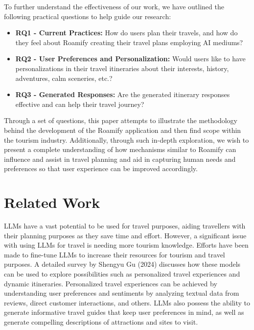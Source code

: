 \documentclass[final,3p,times,authoryear]{elsarticle}
\begin{document}
    To further understand the effectiveness of our work, we have outlined the following practical questions to help guide our research:
    
    \begin{itemize}
        \item \textbf{RQ1 - Current Practices:} How do users plan their travels, and how do they feel about Roamify creating their travel plans employing AI mediums?
        \item \textbf{RQ2 - User Preferences and Personalization:} Would users like to have personalizations in their travel itineraries about their interests, history, adventures, calm sceneries, etc.?
        \item \textbf{RQ3 - Generated Responses:} Are the generated itinerary responses effective and can help their travel journey?
        
    \end{itemize}
    
    Through a set of questions, this paper attempts to illustrate the methodology behind the development of the Roamify application and then find scope within the tourism industry. Additionally, through such in-depth exploration, we wish to present a complete understanding of how mechanisms similar to Roamify can influence and assist in travel planning and aid in capturing human needs and preferences so that user experience can be improved accordingly.

\vspace{-7pt}

\section{Related Work}
    LLMs have a vast potential to be used for travel purposes, aiding travellers with their planning purposes as they save time and effort. However, a significant issue with using LLMs for travel is needing more tourism knowledge\cite{ref1}. Efforts have been made to fine-tune LLMs to increase their resources for tourism and travel purposes\cite{ref3}. A detailed survey by Shengyu Gu (2024) discusses how these models can be used to explore possibilities such as personalized travel experiences and dynamic itineraries\cite{ref4}. Personalized travel experiences can be achieved by understanding user preferences and sentiments by analyzing textual data from reviews, direct customer interactions, and others. LLMs also possess the ability to generate informative travel guides that keep user preferences in mind, as well as generate compelling descriptions of attractions and sites to visit.
    
\end{document}
